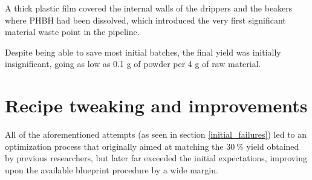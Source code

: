 \documentclass{article}
\begin{document}
        A thick plastic film covered the internal walls of the drippers and the beakers where PHBH had been dissolved, which 
        introduced the very first significant material waste point in the pipeline. 


        Despite being able to save most initial batches, the final yield was initially insignificant, going as low as 0.1 g of powder 
        per 4 g of raw material. \\ 
        
%





    \clearpage

    \section{Recipe tweaking and improvements\label{recipe_improvement}}

    All of the aforementioned attempts (as seen in section \ref{initial_failures}) led to an optimization process that originally aimed at 
    matching the $30 \ \%$ yield obtained by previous researchers, but later far exceeded the 
    initial expectations, improving upon the available blueprint procedure by a wide margin. 
\end{document}
